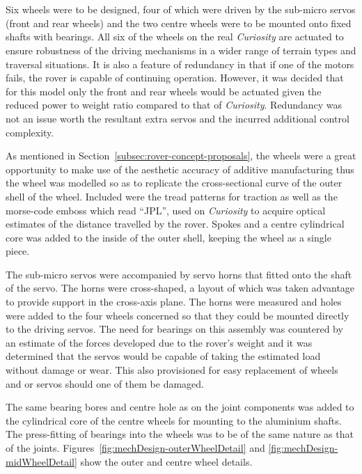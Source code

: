       \newpage
      \\\\
        Six wheels were to be designed, four of which were driven by the sub-micro servos (front and rear wheels) and the two centre wheels were to be mounted onto fixed shafts with bearings. All six of the wheels on the real \textit{Curiosity} are actuated to ensure robustness of the driving mechanisms in a wider range of terrain types and traversal situations. It is also a feature of redundancy in that if one of the motors fails, the rover is capable of continuing operation. However, it was decided that for this model only the front and rear wheels would be actuated given the reduced power to weight ratio compared to that of \textit{Curiosity}. Redundancy was not an issue worth the resultant extra servos and the incurred additional control complexity.
        
        As mentioned in Section~\ref{subsec:rover-concept-proposals}, the wheels were a great opportunity to make use of the aesthetic accuracy of additive manufacturing thus the wheel was modelled so as to replicate the cross-sectional curve of the outer shell of the wheel. Included were the tread patterns for traction as well as the morse-code emboss which read ``JPL'', used on \textit{Curiosity} to acquire optical estimates of the distance travelled by the rover. Spokes and a centre cylindrical core was added to the inside of the outer shell, keeping the wheel as a single piece.
        
        The sub-micro servos were accompanied by servo horns that fitted onto the shaft of the servo. The horns were cross-shaped, a layout of which was taken advantage to provide support in the cross-axis plane. The horns were measured and holes were added to the four wheels concerned so that they could be mounted directly to the driving servos. The need for bearings on this assembly was countered by an estimate of the forces developed due to the rover's weight and it was determined that the servos would be capable of taking the estimated load without damage or wear. This also provisioned for easy replacement of wheels and or servos should one of them be damaged.
        
        The same bearing bores and centre hole as on the joint components was added to the cylindrical core of the centre wheels for mounting to the aluminium shafts. The press-fitting of bearings into the wheels was to be of the same nature as that of the joints. Figures~\ref{fig:mechDesign-outerWheelDetail} and \ref{fig:mechDesign-midWheelDetail} show the outer and centre wheel details.
        
